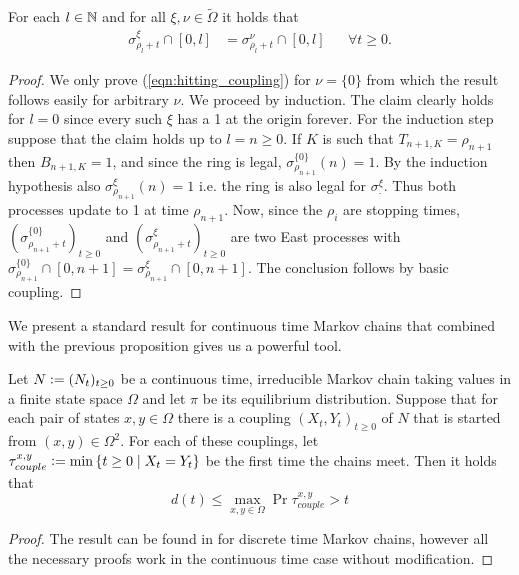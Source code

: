\begin{proposition}\label{prop:East_linear_coupling}
For each $l \in \mathbb{N}$ and for all $\xi, \nu \in \widetilde{\Omega}$ it holds that 
\begin{align*}
\sigma^\xi_{\rho_l + t} \cap [0, l] &= \sigma^\nu_{\rho_l + t} \cap [0, l] &&\forall t \geq 0. \label{eqn:hitting_coupling}
\end{align*}
\end{proposition}

\begin{proof}
We only prove (\ref{eqn:hitting_coupling}) for $\nu = \{0\}$ from which the result follows easily for arbitrary $\nu$. We proceed by induction. The claim clearly holds for $l=0$ since every such $\xi$ has a 1 at the origin forever. For the induction step suppose that the claim holds up to $l=n \geq 0$. If $K$ is such that $T_{n+1, K} = \rho_{n+1}$ then $B_{n+1, K}=1$, and since the ring is legal, $\sigma^{\{0\}}_{\rho_{n+1}}(n) = 1$. By the induction hypothesis also $\sigma^\xi_{\rho_{n+1}}(n) = 1$ i.e. the ring is also legal for $\sigma^\xi_.$. Thus both processes update to 1 at time $\rho_{n+1}$. Now, since the $\rho_i$ are stopping times, $(\sigma^{\{0\}}_{\rho_{n+1}+t})_{t \geq 0}$ and $(\sigma^\xi_{\rho_{n+1} + t})_{t \geq 0}$ are two East processes with $\sigma^{\{0\}}_{\rho_{n+1}} \cap [0, n+1] = \sigma^\xi_{\rho_{n+1}} \cap [0, n+1] $. The conclusion follows by basic coupling. 
\end{proof}

We present a standard result for continuous time Markov chains that combined with the previous proposition gives us a powerful tool. 

\begin{theorem}\label{thm:equilibrium_distance}
Let $N \vcentcolon= (N_t)_{t \geq 0}$ be a continuous time, irreducible Markov chain taking values in a finite state space $\Omega$ and let $\pi$ be its equilibrium distribution. Suppose that for each pair of states $x,y \in \Omega$ there is a coupling $(X_t, Y_t)_{t \geq 0}$ of $N$ that is started from $(x,y) \in \Omega^2$. For each of these couplings, let $\tau^{x, y}_{couple} \vcentcolon= \min\left\{t \geq 0 \mid X_t = Y_t \right\}$ be the first time the chains meet. Then it holds that 
\begin{equation}\nonumber
d(t) \leq \max\limits_{x,y \in \Omega} \Pr{\tau^{x, y}_{couple} > t}
\end{equation}
\end{theorem}

\begin{proof}
The result can be found in \cite[Corollary 5.3]{levin2017markov} for discrete time Markov chains, however all the necessary proofs work in the continuous time case without modification. 
\end{proof}

